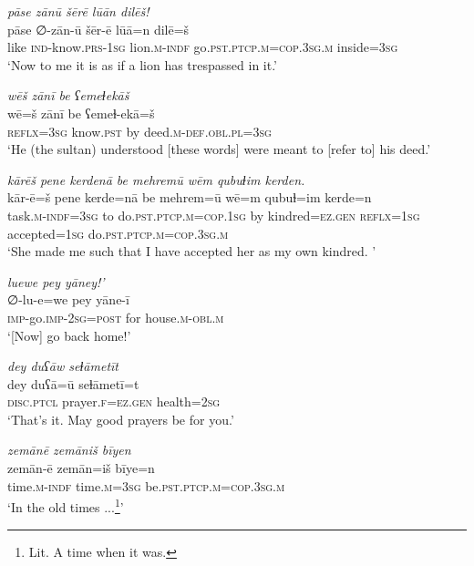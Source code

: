 \ea \label{ŽH.114}
\textit{pāse zānū šērē lūān dilēš!} \\ 
\gll pāse ∅-zān-ū šēr-ē lūā=n dilē=š \\ 
 like \textsc{ind-}know\textsc{.prs}\textsc{-1sg} lion\textsc{.m}\textsc{-indf} go\textsc{.pst}\textsc{.ptcp}\textsc{.m}\textsc{=cop}\textsc{.3sg}\textsc{.m} inside\textsc{=3sg} \\ 
\glt `Now to me it is as if a lion has trespassed in it.'
\z 
 
\ea \label{ŽH.115}
\textit{wēš zānī be ʕemeɫekāš} \\ 
\gll wē=š zānī be ʕemeɫ-ekā=š \\ 
 \textsc{reflx}\textsc{=3sg} know\textsc{.pst} by deed\textsc{.m}\textsc{-def}\textsc{.obl}\textsc{.pl}\textsc{=3sg} \\ 
\glt `He (the sultan) understood [these words] were meant to [refer to] his deed.'
\z 
 
\ea \label{ŽH.117}
\textit{kārēš pene kerdenā be mehremū wēm qubuɫim kerden.} \\ 
\gll kār-ē=š pene kerde=nā be mehrem=ū wē=m qubuɫ=im kerde=n \\ 
 task\textsc{.m}\textsc{-indf}\textsc{=3sg} to do\textsc{.pst}\textsc{.ptcp}\textsc{.m}\textsc{=cop}\textsc{.1sg} by kindred\textsc{=ez}\textsc{.gen} \textsc{reflx}\textsc{=1sg} accepted\textsc{=1sg} do\textsc{.pst}\textsc{.ptcp}\textsc{.m}\textsc{=cop}\textsc{.3sg}\textsc{.m} \\ 
\glt `She made  me such that I have accepted her as my own kindred. '
\z 
 
\ea \label{ŽH.118}
\textit{luewe pey yāney!’} \\ 
\gll ∅-lu-e=we pey yāne-ī \\ 
 \textsc{imp-}go.\textsc{imp-}\textsc{2sg}\textsc{=\textsc{post}} for house\textsc{.m}\textsc{-obl}\textsc{.m} \\ 
\glt `[Now] go back home!'
\z 
 
\ea \label{ŽH.119}
\textit{dey duʕāw seɫāmetīt} \\ 
\gll dey duʕā=ū seɫāmetī=t \\ 
 \textsc{disc.ptcl} prayer\textsc{\textsc{.f}}\textsc{=ez}\textsc{.gen} health\textsc{=\textsc{2sg}} \\ 
\glt `That’s it. May good prayers  be for you.'
\z 



\ea \label{RE.1}
\textit{zemānē zemāniš bīyen} \\ 
\gll zemān-ē zemān=iš bīye=n \\ 
 time\textsc{.m}\textsc{-indf} time\textsc{.m}\textsc{=3sg} be\textsc{.pst}\textsc{.ptcp}\textsc{.m}\textsc{=cop}\textsc{.3sg}\textsc{.m} \\ 
\glt `In the old times ...\footnote{Lit. A time when it was.}'
\z 
 
